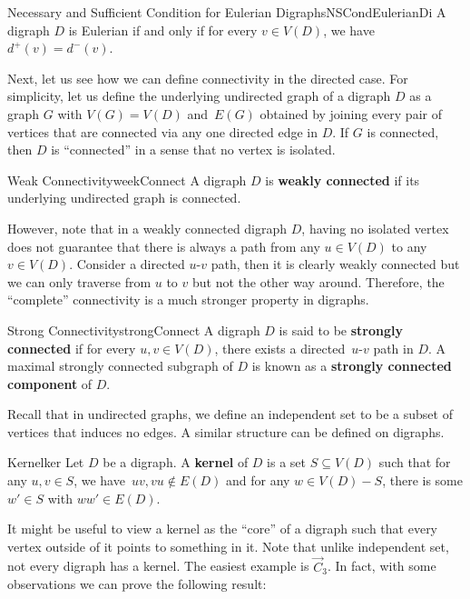 \documentclass[math]{amznotes}
\theoremstyle{remark}
\begin{document}
\begin{probox}{Necessary and Sufficient Condition for Eulerian Digraphs}{NSCondEulerianDi}
    A digraph $D$ is Eulerian if and only if for every $v \in V(D)$, we have $d^+(v) = d^-(v)$.
\end{probox}
Next, let us see how we can define connectivity in the directed case. For simplicity, let us define the underlying undirected graph of a digraph $D$ as a graph $G$ with $V(G) = V(D)$ and~$E(G)$ obtained by joining every pair of vertices that are connected via any one directed edge in $D$. If $G$ is connected, then $D$ is ``connected'' in a sense that no vertex is isolated.
\begin{dfnbox}{Weak Connectivity}{weekConnect}
    A digraph $D$ is {\color{red} \textbf{weakly connected}} if its underlying undirected graph is connected.
\end{dfnbox}
However, note that in a weakly connected digraph $D$, having no isolated vertex does not guarantee that there is always a path from any $u \in V(D)$ to any $v \in V(D)$. Consider a directed $u$-$v$ path, then it is clearly weakly connected but we can only traverse from $u$ to $v$ but not the other way around. Therefore, the ``complete'' connectivity is a much stronger property in digraphs.
\begin{dfnbox}{Strong Connectivity}{strongConnect}
    A digraph $D$ is said to be {\color{red} \textbf{strongly connected}} if for every $u, v \in V(D)$, there exists a directed~$u$-$v$ path in $D$. A maximal strongly connected subgraph of $D$ is known as a {\color{red} \textbf{strongly connected component}} of $D$.
\end{dfnbox}
Recall that in undirected graphs, we define an independent set to be a subset of vertices that induces no edges. A similar structure can be defined on digraphs.
\begin{dfnbox}{Kernel}{ker}
    Let $D$ be a digraph. A {\color{red} \textbf{kernel}} of $D$ is a set $S \subseteq V(D)$ such that for any $u, v \in S$, we have~$uv, vu \notin E(D)$ and for any $w \in V(D) - S$, there is some $w' \in S$ with $ww' \in E(D)$.
\end{dfnbox}
It might be useful to view a kernel as the ``core'' of a digraph such that every vertex outside of it points to something in it. Note that unlike independent set, not every digraph has a kernel. The easiest example is $\overrightarrow{C}_3$. In fact, with some observations we can prove the following result:
\end{document}
